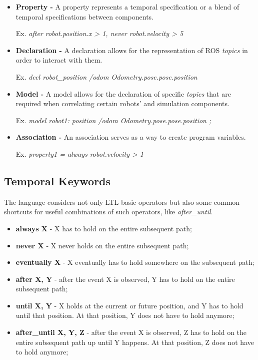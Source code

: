 \begin{itemize}
\item \textbf{Property -} A property represents a temporal specification or a blend of temporal specifications between components.

Ex. \textit{after robot.position.x > 1, never robot.velocity > 5}

\item \textbf{Declaration -} A declaration allows for the representation of ROS \textit{topics} in order to interact with them.

Ex. \textit{decl robot\_position /odom Odometry.pose.pose.position}

\item \textbf{Model -} A model allows for the declaration of specific \textit{topics} that are required when correlating certain robots' and simulation components.

Ex. \textit{model robot1: position /odom Odometry.pose.pose.position ;}

\item \textbf{Association -} An association serves as a way to create program variables.

Ex. \textit{property1 = always robot.velocity > 1}

\end{itemize}


\subsection{Temporal Keywords}
\label{ssec:tempkeywords}

The language considers not only LTL basic operators but also some common shortcuts for useful combinations of such operators, like \textit{after\_until}.

\begin{itemize}
\item {\bfseries always X} - X has to hold on the entire subsequent path;
\item {\bfseries never X} - X never holds on the entire subsequent path;
\item {\bfseries eventually X} - X eventually has to hold somewhere on the subsequent path;
\item {\bfseries after X, Y} - after the event X is observed, Y has to hold on the entire subsequent path;
\item {\bfseries until X, Y} - X holds at the current or future position, and Y has to hold until that position. At that position, Y does not have to hold anymore;
\item {\bfseries after\_until X, Y, Z} - after the event X is observed, Z has to hold on the entire subsequent path up until Y happens. At that position, Z does not have to hold anymore;
\end{itemize}

